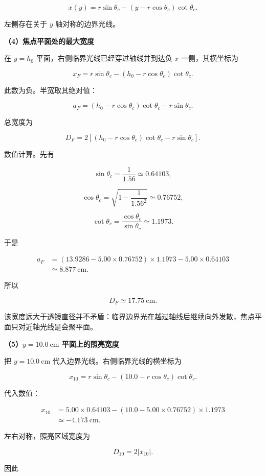 \documentclass[12pt,a4paper,UTF8]{ctexart}
\begin{document}
\[
\boxed{
x(y)=r\sin\theta_c
-(y-r\cos\theta_c)\cot\theta_c
}.
\]

左侧存在关于 \(y\) 轴对称的边界光线。

\textbf{（4）焦点平面处的最大宽度}

在 \(y=h_0\) 平面，右侧临界光线已经穿过轴线并到达负 \(x\)
一侧，其横坐标为

\[
x_F=r\sin\theta_c
-(h_0-r\cos\theta_c)\cot\theta_c.
\]

此数为负。半宽取其绝对值：

\[
a_F=(h_0-r\cos\theta_c)\cot\theta_c-r\sin\theta_c.
\]

总宽度为

\[
\boxed{
D_F=2\left[
(h_0-r\cos\theta_c)\cot\theta_c
-r\sin\theta_c
\right]
}.
\]

数值计算。先有

\[
\sin\theta_c=\frac1{1.56}\simeq0.64103,
\]

\[
\cos\theta_c
=\sqrt{1-\frac1{1.56^2}}
\simeq0.76752,
\]

\[
\cot\theta_c
=\frac{\cos\theta_c}{\sin\theta_c}
\simeq1.1973.
\]

于是

\[
\begin{aligned}
a_F
&=(13.9286-5.00\times0.76752)\times1.1973
-5.00\times0.64103\\
&\simeq8.877\ \mathrm{cm}.
\end{aligned}
\]

所以

\[
\boxed{D_F\simeq17.75\ \mathrm{cm}}.
\]

该宽度远大于透镜直径并不矛盾：临界边界光在越过轴线后继续向外发散，焦点平面只对近轴光线是会聚平面。

\textbf{（5）\(y=10.0\ \mathrm{cm}\) 平面上的照亮宽度}

把 \(y=10.0\ \mathrm{cm}\) 代入边界光线。右侧临界光线的横坐标为

\[
x_{10}=r\sin\theta_c
-(10.0-r\cos\theta_c)\cot\theta_c.
\]

代入数值：

\[
\begin{aligned}
x_{10}
&=5.00\times0.64103
-(10.0-5.00\times0.76752)\times1.1973\\
&\simeq-4.173\ \mathrm{cm}.
\end{aligned}
\]

左右对称，照亮区域宽度为

\[
D_{10}=2|x_{10}|.
\]

因此
\end{document}
